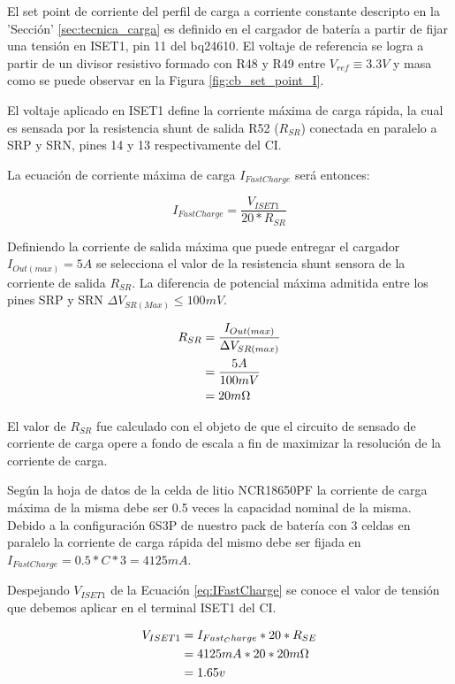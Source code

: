 \documentclass[10pt, a4paper]{report}
\begin{document}
El set point de corriente del perfil de carga a corriente constante descripto en
la 'Sección' \ref{sec:tecnica_carga} es definido en el cargador de batería a
partir de fijar una tensión en ISET1, pin 11 del bq24610. El voltaje de
referencia se logra a partir de un divisor resistivo formado con R48 y R49 entre
$V_{ref} \equiv 3.3V$ y masa como se puede observar en la Figura
\ref{fig:cb_set_point_I}. 

El voltaje aplicado en ISET1 define la corriente máxima de carga rápida, la cual
es sensada por la resistencia shunt de salida R52 ($R_{SR}$) conectada en
paralelo a SRP y SRN, pines 14 y 13 respectivamente del \acrshort{CI}.

La ecuación de corriente máxima de carga $I_{FastCharge}$ será entonces:

\begin{equation}
    I_{FastCharge}=\frac{V_{ISET1}}{20*R_{SR}}
    \label{eq:IFastCharge}
\end{equation}

Definiendo la corriente de salida máxima que puede entregar el cargador
$I_{Out (max)}=5A$ se selecciona el valor de la resistencia shunt sensora de la
corriente de salida $R_{SR}$. La diferencia de potencial máxima admitida entre
los pines SRP y SRN $\Delta V_{SR (Max)} \leq 100mV$.

\begin{align}
    R_{SR}&=\frac{I_{Out (max)}}{\Delta V_{SR (max)}}\\
    &=\frac{5A}{100mV}\\
    &=20m\ohm
\end{align}

El valor de $R_{SR}$ fue calculado con el objeto de que el circuito de sensado
de corriente de carga opere a fondo de escala a fin de maximizar la resolución
de la corriente de carga. 

Según la hoja de datos de la celda de litio NCR18650PF la corriente de
carga máxima de la misma debe ser 0.5 veces la capacidad nominal de la misma.
Debido a la configuración 6S3P de nuestro pack de batería con 3 celdas en
paralelo la corriente de carga rápida del mismo debe ser fijada en 
$I_{FastCharge}=0.5*C*3=4125mA$.

Despejando $V_{ISET1}$ de la Ecuación \ref{eq:IFastCharge} se conoce el
valor de tensión que debemos aplicar en el terminal ISET1 del \acrshort{CI}.

\begin{align}
    V_{ISET1}&=I_{Fast_Charge}*20*R_{SE}\\
    &=4125mA*20*20m\ohm\\
    &=1.65v
\end{align}
\end{document}
